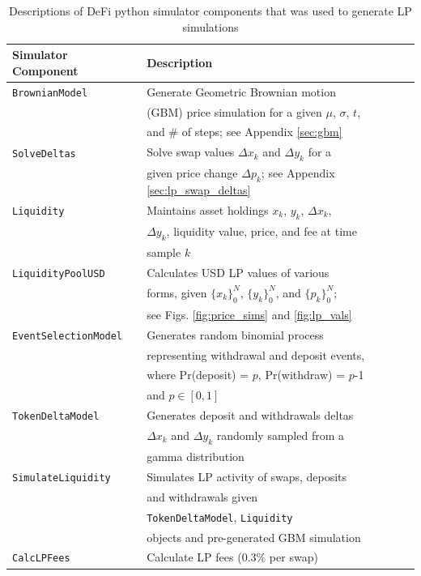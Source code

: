 \documentclass[journal,twocolumn,12pt]{ieeesyscoin}
\begin{document}
\begin{table}[h]
\centering
\begin{tabular}{ |l|l| } 
\hline
 \textbf{Simulator Component} & \textbf{Description} \\
\hline
\verb|BrownianModel|          & Generate Geometric Brownian motion   \\
					 &  (GBM) price simulation for a given $\mu$, $\sigma$, $t$,\\
					 &  and  \#  of steps; see Appendix \ref{sec:gbm} \\
\verb|SolveDeltas|          & Solve swap values $\Delta x_{k}$ and $\Delta y_{k}$ for a  \\
					&  given price change  $\Delta p_{k}$; see Appendix \ref{sec:lp_swap_deltas}\\ 
\verb|Liquidity|          & Maintains asset holdings $x_{k}$, $y_{k}$, $\Delta x_{k}$,  \\
				   &  $\Delta y_{k}$, liquidity value, price, and fee at time  \\ 
				   &  sample $k$ \\
\verb|LiquidityPoolUSD|          & Calculates USD LP values of various \\
						&	 forms, given $\{x_{k}\}_{0}^{N}$,  $\{y_{k}\}_{0}^{N}$, and  $\{p_{k}\}_{0}^{N}$; \\ 
					    &	see Figs. \ref{fig:price_sims} and \ref{fig:lp_vals} \\ 
\verb|EventSelectionModel|          & Generates random binomial process  \\ 
							& representing withdrawal and deposit events,   \\
							& where  Pr(deposit) = $p$, Pr(withdraw) = $p$-1  \\
							& and $p \in [0,1]$  \\
\verb|TokenDeltaModel|          & Generates deposit and withdrawals deltas\\ 
					     & $\Delta x_{k}$ and $\Delta y_{k}$ randomly sampled from a \\
					     & gamma distribution\\		
\verb|SimulateLiquidity|          & Simulates LP activity of swaps, deposits   \\
						  & and withdrawals given  \\
						  & \verb|TokenDeltaModel|,  \verb|Liquidity|   \\
						  & objects  and  pre-generated  GBM simulation \\ 
\verb|CalcLPFees|          & Calculate LP fees (0.3\% per swap) \\

\hline
\end{tabular}
\caption{Descriptions of DeFi python simulator components that was used to generate LP simulations}
\label{table:simulator_components}
\end{table}
\end{document}
